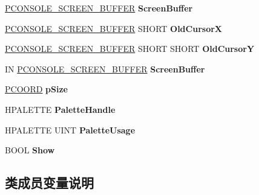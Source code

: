 \begin{DoxyCompactItemize}
\hyperlink{struct___c_o_n_s_o_l_e___s_c_r_e_e_n___b_u_f_f_e_r}{P\+C\+O\+N\+S\+O\+L\+E\+\_\+\+S\+C\+R\+E\+E\+N\+\_\+\+B\+U\+F\+F\+ER} {\bfseries Screen\+Buffer}
\item 
\mbox{\label{struct___t_e_r_m_i_n_a_l___v_t_b_l_a3211a604436ae1d8ad326d5ec587c72e}} 
\hyperlink{struct___c_o_n_s_o_l_e___s_c_r_e_e_n___b_u_f_f_e_r}{P\+C\+O\+N\+S\+O\+L\+E\+\_\+\+S\+C\+R\+E\+E\+N\+\_\+\+B\+U\+F\+F\+ER} S\+H\+O\+RT {\bfseries Old\+CursorX}
\item 
\mbox{\label{struct___t_e_r_m_i_n_a_l___v_t_b_l_a2eaba88e74c3c0e4e9e40c59497d8aec}} 
\hyperlink{struct___c_o_n_s_o_l_e___s_c_r_e_e_n___b_u_f_f_e_r}{P\+C\+O\+N\+S\+O\+L\+E\+\_\+\+S\+C\+R\+E\+E\+N\+\_\+\+B\+U\+F\+F\+ER} S\+H\+O\+RT S\+H\+O\+RT {\bfseries Old\+CursorY}
\item 
\mbox{\label{struct___t_e_r_m_i_n_a_l___v_t_b_l_a47b37093e915f227b59237470eda60fa}} 
IN \hyperlink{struct___c_o_n_s_o_l_e___s_c_r_e_e_n___b_u_f_f_e_r}{P\+C\+O\+N\+S\+O\+L\+E\+\_\+\+S\+C\+R\+E\+E\+N\+\_\+\+B\+U\+F\+F\+ER} {\bfseries Screen\+Buffer}
\item 
\mbox{\label{struct___t_e_r_m_i_n_a_l___v_t_b_l_ae669a384c0509da35a1878d2d8caf046}} 
\hyperlink{struct___c_o_o_r_d}{P\+C\+O\+O\+RD} {\bfseries p\+Size}
\item 
\mbox{\label{struct___t_e_r_m_i_n_a_l___v_t_b_l_ac884121fe008a1841e9922268399dc38}} 
H\+P\+A\+L\+E\+T\+TE {\bfseries Palette\+Handle}
\item 
\mbox{\label{struct___t_e_r_m_i_n_a_l___v_t_b_l_a6b279f552b6d0fcb3c8b7829c972e8f5}} 
H\+P\+A\+L\+E\+T\+TE U\+I\+NT {\bfseries Palette\+Usage}
\item 
\mbox{\label{struct___t_e_r_m_i_n_a_l___v_t_b_l_a357ec5b0f412dab471d6f2abbda30ade}} 
B\+O\+OL {\bfseries Show}
\end{DoxyCompactItemize}


\subsection{类成员变量说明}
\mbox{\label{struct___t_e_r_m_i_n_a_l___v_t_b_l_ab5f8da45c8c2ed9774f5a5ec02a308f0}} 
